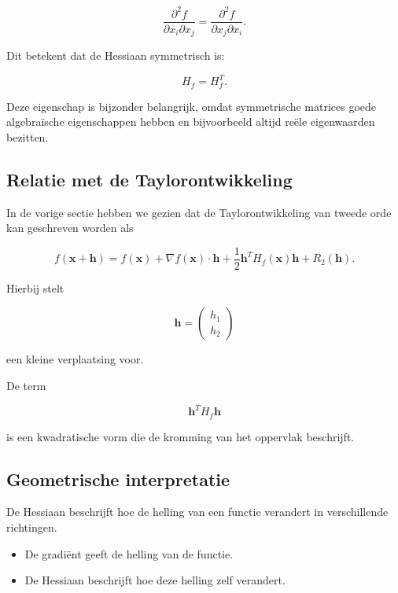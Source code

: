 \documentclass[11pt,a4paper]{article}
\begin{document}
    \[
        \frac{\partial^2 f}{\partial x_i \partial x_j}
        =
        \frac{\partial^2 f}{\partial x_j \partial x_i}.
    \]

    Dit betekent dat de Hessiaan symmetrisch is:

    \[
        H_f = H_f^T.
    \]

    Deze eigenschap is bijzonder belangrijk, omdat symmetrische matrices
    goede algebraïsche eigenschappen hebben en bijvoorbeeld altijd
    reële eigenwaarden bezitten.

    \subsection{Relatie met de Taylorontwikkeling}

    In de vorige sectie hebben we gezien dat de Taylorontwikkeling
    van tweede orde kan geschreven worden als

    \[
        f(\mathbf{x}+\mathbf{h})
        =
        f(\mathbf{x})
        +
        \nabla f(\mathbf{x}) \cdot \mathbf{h}
        +
        \frac{1}{2}
        \mathbf{h}^T H_f(\mathbf{x}) \mathbf{h}
        +
        R_2(\mathbf{h}).
    \]

    Hierbij stelt

    \[
        \mathbf{h} =
        \begin{pmatrix}
            h_1 \\
            h_2
        \end{pmatrix}
    \]

    een kleine verplaatsing voor.

    De term

    \[
        \mathbf{h}^T H_f \mathbf{h}
    \]

    is een kwadratische vorm die de kromming van het oppervlak
    beschrijft.

    \subsection{Geometrische interpretatie}

    De Hessiaan beschrijft hoe de helling van een functie verandert
    in verschillende richtingen.

    \begin{itemize}

        \item De gradiënt geeft de helling van de functie.

        \item De Hessiaan beschrijft hoe deze helling zelf verandert.

    \end{itemize}
\end{document}
